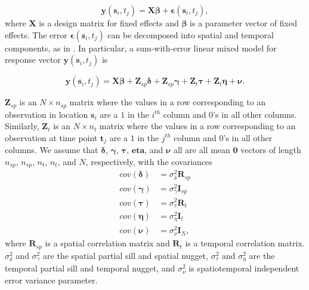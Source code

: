 \documentclass[]{interact}
\theoremstyle{plain}%
\theoremstyle{definition}
\theoremstyle{remark}
\begin{document}
\begin{equation}
\mathbf{y}(\mathbf{s}_{i}, t_j) = \mathbf{X} \bm{\beta} + \bm{\epsilon}(\mathbf{s}_{i}, t_j),
\end{equation} \noindent where \(\mathbf{X}\) is a design matrix for
fixed effects and \(\bm{\beta}\) is a parameter vector of fixed effects.
The error \(\bm{\epsilon}(\mathbf{s}_{i}, t_j)\) can be decomposed into
spatial and temporal components, as in \citet{dumelle2021linear}. In
particular, a sum-with-error linear mixed model for response vector
\(\mathbf{y}(\mathbf{s}_{i}, t_j)\) is

\begin{equation} \label{equation:model}
\mathbf{y}(\mathbf{s}_{i}, t_j) = \mathbf{X} \bm{\beta} + \mathbf{Z}_{sp} \bm{\delta} + \mathbf{Z}_{sp} \bm{\gamma} + \mathbf{Z}_t \bm{\tau} + \mathbf{Z}_t \bm{\eta} + \bm{\nu}.
\end{equation}

\(\mathbf{Z}_{sp}\) is an \(N \times n_{sp}\) matrix where the values in
a row corresponding to an observation in location \(\mathbf{s}_{i}\) are
a \(1\) in the \(i^{th}\) column and 0's in all other columns.
Similarly, \(\mathbf{Z}_t\) is an \(N \times n_{t}\) matrix where the
values in a row corresponding to an observation at time point
\(\mathbf{t}_j\) are a \(1\) in the \(j^{th}\) column and 0's in all
other columns. We assume that \(\bm{\delta}\), \(\bm{\gamma}\),
\(\bm{\tau}\), \(\bm{eta}\), and \(\bm{\nu}\) all are all mean
\(\mathbf{0}\) vectors of length \(n_{sp}\), \(n_{sp}\), \(n_t\),
\(n_t\), and \(N\), respectively, with the covariances \mbox{}
\begin{align*}
cov(\bm{\delta}) &= \sigma^2_{\delta} \mathbf{R}_{sp} \\
cov(\bm{\gamma}) &= \sigma^2_{\gamma} \mathbf{I}_{sp} \\
cov(\bm{\tau}) &= \sigma^2_{\tau} \mathbf{R}_t \\
cov(\bm{\eta}) &= \sigma^2_{\eta} \mathbf{I}_t \\
cov(\bm{\nu}) &= \sigma^2_{\nu} \mathbf{I}_N,
\end{align*} \noindent where \(\mathbf{R}_{sp}\) is a spatial
correlation matrix and \(\mathbf{R}_t\) is a temporal correlation
matrix. \(\sigma^2_{\delta}\) and \(\sigma^2_{\gamma}\) are the spatial
partial sill and spatial nugget, \(\sigma^2_{\tau}\) and
\(\sigma^2_{\eta}\) are the temporal partial sill and temporal nugget,
and \(\sigma^2_{\nu}\) is spatiotemporal independent error variance
parameter.
\end{document}
